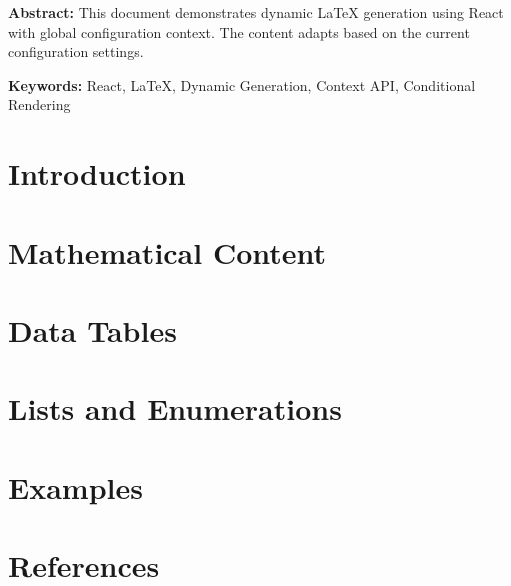\documentclass{article}
\begin{document}
\textbf{Abstract:} This document demonstrates dynamic LaTeX generation using React with global configuration context. The content adapts based on the current configuration settings.

\textbf{Keywords:} React, LaTeX, Dynamic Generation, Context API, Conditional Rendering

\section{Introduction}

\section{Mathematical Content}


\section{Data Tables}


\section{Lists and Enumerations}


\section{Examples}


\section{References}
\end{document}
